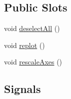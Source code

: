 \subsection*{Public Slots}
\begin{DoxyCompactItemize}
\item 
void \hyperlink{classQCustomPlot_a9d4808ab925b003054085246c92a257c}{deselect\-All} ()
\item 
void \hyperlink{classQCustomPlot_a563540b54b2a09c8ef092d42e9621f42}{replot} ()
\item 
void \hyperlink{classQCustomPlot_a48baf5d1dca179ac707b739abdf260ba}{rescale\-Axes} ()
\end{DoxyCompactItemize}
\subsection*{Signals}
